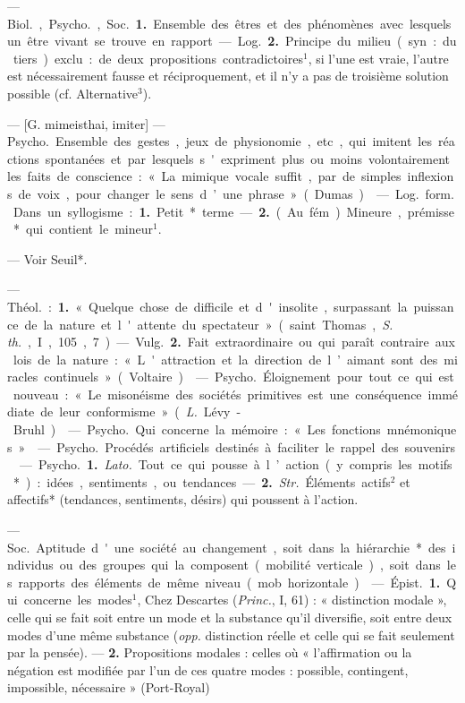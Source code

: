 \begin{itemize}[leftmargin=1cm, label=, itemsep=1pt]
 — \si{Biol.}, \si{Psycho.}, \si{Soc.} {\bf 1.} Ensemble des êtres et des phénomènes
avec lesquels un être vivant se trouve
en rapport.

— \si{Log.} {\bf 2.} Principe du milieu
(syn. : du tiers) exclu : de deux propositions contradictoires$^1$, si l’une
est vraie, l’autre est nécessairement
fausse et réciproquement, et il n’y a
pas de troisième solution possible
(cf. Alternative$^3$).

 — [G. mimeisthai, imiter] —
\si{Psycho.} Ensemble des gestes, jeux
de physionomie, etc, qui imitent
les réactions spontanées et par lesquels s'expriment plus ou moins
volontairement les faits de conscience : « La mimique vocale suffit,
par de simples inflexions de voix,
pour changer le sens d’une phrase »
(Dumas).

 — \si{Log.} \si{form.} Dans un syllogisme : {\bf 1.} Petit* terme. — {\bf 2.} (Au
fém.). Mineure, prémisse* qui contient le mineur$^1$.

 — Voir Seuil*.

 — \si{Théol.} : {\bf 1.} « Quelque chose
de difficile et d'insolite, surpassant
la puissance de la nature et l'attente
du spectateur » (saint Thomas,
{\it S. th.}, I, 105, 7). — \si{Vulg.} {\bf 2.} Fait
extraordinaire ou qui paraît contraire aux lois de la nature : « L'attraction et la direction de l’aimant
sont des miracles continuels » (Voltaire).

 — \si{Psycho.} Éloignement
pour tout ce qui est nouveau : « Le
misonéisme des sociétés primitives
est une conséquence immédiate de
leur conformisme » ({\it L.} Lévy-Bruhl).

 — \si{Psycho.} Qui concerne
la mémoire : « Les fonctions mnémoniques. »

 — \si{Psycho.} Procédés
artificiels destinés à faciliter le
rappel des souvenirs.

 — \si{Psycho.} {\bf 1.} {\it Lato.} Tout ce
qui pousse à l’action (y compris les
motifs*) : idées, sentiments, ou
tendances. — {\bf 2.} {\it Str.} Éléments actifs$^2$
et affectifs* (tendances, sentiments,
désirs) qui poussent à l’action.

 — \si{Soc.} Aptitude
d'une société au changement, soit
dans la hiérarchie* des individus ou
des groupes qui la composent (mobilité verticale), soit dans les rapports
des éléments de même niveau (mob.
horizontale).

 — \si{Épist.} {\bf 1.} Qui concerne les
modes$^1$, Chez Descartes ({\it Princ.}, I,
61) : « distinction modale », celle qui
se fait soit entre un mode et la substance
qu'il diversifie, soit entre
deux modes d’une même substance
({\it opp.} distinction réelle et celle qui
se fait seulement par la pensée). —
 {\bf 2.} Propositions modales : celles où
« l'affirmation ou la négation est
modifiée par l'un de ces quatre
modes : possible, contingent, impossible, nécessaire » (Port-Royal)


\end{itemize}
